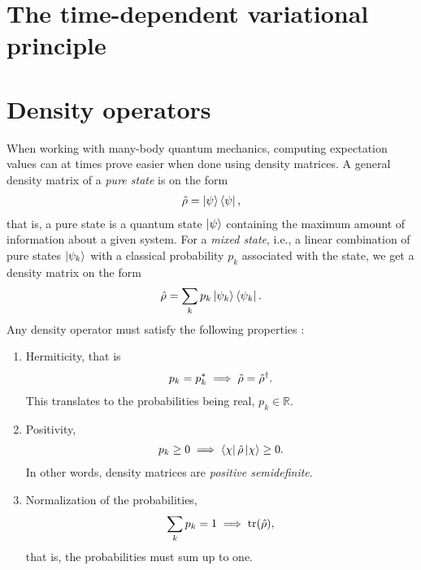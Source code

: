     \section{The time-dependent variational principle}


    \section{Density operators}
        \label{sec:density-operators}
        When working with many-body quantum mechanics, computing expectation
        values can at times prove easier when done using density matrices. A
        general density matrix of a \emph{pure state} is on the form
        \begin{align}
            \hat{\rho} = \ket{\psi}\bra{\psi},
        \end{align}
        that is, a pure state is a quantum state $\ket{\psi}$ containing the
        maximum amount of information about a given system. For a \emph{mixed
        state}, i.e., a linear combination of pure states $\ket{\psi_k}$ with a
        classical probability $p_k$ associated with the state, we get a density
        matrix on the form
        \begin{align}
            \hat{\rho} = \sum_{k} p_k \ket{\psi_k}\bra{\psi_k}.
        \end{align}
        Any density operator must satisfy the following
        properties \cite{modern-qm}:
        \begin{enumerate}
            \item Hermiticity, that is
                \begin{align}
                    p_k = p_k^{*} \implies \hat{\rho} = \hat{\rho}^{\dagger}.
                \end{align}
                This translates to the probabilities being real, $p_k \in
                \mathbb{R}$.
            \item Positivity,
                \begin{align}
                    p_k \geq 0 \implies \bra{\chi}\hat{\rho}\ket{\chi} \geq 0.
                \end{align}
                In other words, density matrices are \emph{positive
                semidefinite}.
            \item Normalization of the probabilities,
                \begin{align}
                    \sum_{k} p_k = 1 \implies \tr(\hat{\rho}),
                \end{align}
                that is, the probabilities must sum up to one.
        \end{enumerate}
